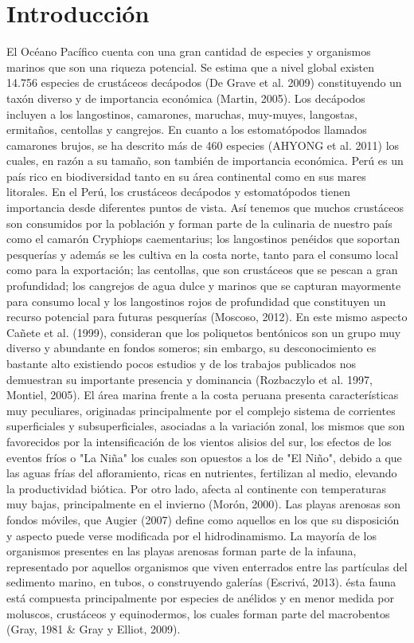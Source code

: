 \documentclass[5p,times,authoryear]{elsarticle}
\begin{document}
\section{Introducción}
El Oc\'eano Pac\'ifico cuenta con una gran cantidad de especies y organismos marinos que son una riqueza potencial. Se estima que a nivel global existen 14.756 especies de crust\'aceos dec\'apodos (De Grave et al. 2009) constituyendo un tax\'on diverso y de importancia econ\'omica (Martin, 2005). Los dec\'apodos incluyen a los langostinos, camarones, maruchas, muy-muyes, langostas, ermita\~nos, centollas y cangrejos. En cuanto a los estomat\'opodos llamados camarones brujos, se ha descrito m\'as de 460 especies (AHYONG et al. 2011) los cuales, en raz\'on a su tama\~no, son tambi\'en de importancia econ\'omica. 
Per\'u es un pa\'is rico en biodiversidad tanto en su \'area continental como en sus mares litorales.  En el Per\'u, los crust\'aceos dec\'apodos y estomat\'opodos tienen importancia desde diferentes puntos de vista. As\'i tenemos que muchos crust\'aceos son consumidos por la poblaci\'on y forman parte de la culinaria de nuestro pa\'is como el camar\'on Cryphiops caementarius; los langostinos pen\'eidos que soportan pesquer\'ias y adem\'as se les cultiva en la costa norte, tanto para el consumo local como para la exportaci\'on; las centollas, que son crust\'aceos que se pescan a gran profundidad; los cangrejos de agua dulce y marinos que se capturan mayormente para consumo local y los langostinos rojos de profundidad que constituyen un recurso potencial para futuras pesquer\'ias (Moscoso, 2012).
En este mismo aspecto Ca\~nete et al. (1999), consideran que los poliquetos bent\'onicos son un grupo muy diverso y abundante en fondos someros; sin embargo, su desconocimiento es bastante alto existiendo pocos estudios y de los trabajos publicados nos demuestran su importante presencia y dominancia (Rozbaczylo et al. 1997, Montiel, 2005).
El \'area marina frente a la costa peruana presenta caracter\'isticas muy peculiares, originadas principalmente por el complejo sistema de corrientes superficiales y subsuperficiales, asociadas a la variaci\'on zonal, los mismos que son favorecidos por la intensificaci\'on de los vientos alisios del sur, los efectos de los eventos fr\'ios o "La Ni\~na" los cuales son opuestos a los de "El Ni\~no", debido a que las aguas fr\'ias del afloramiento, ricas en nutrientes, fertilizan al medio, elevando la productividad bi\'otica. Por otro lado, afecta al continente con temperaturas muy bajas, principalmente en el invierno (Mor\'on, 2000).
Las playas arenosas son fondos m\'oviles, que Augier (2007) define como aquellos en los que su disposici\'on y aspecto puede verse modificada por el hidrodinamismo. La mayor\'ia de los organismos presentes en las playas arenosas forman parte de la infauna, representado por aquellos organismos que viven enterrados entre las part\'iculas del sedimento marino, en tubos, o construyendo galer\'ias (Escriv\'a, 2013). \'esta fauna est\'a compuesta principalmente por especies de an\'elidos y en menor medida por moluscos, crust\'aceos y equinodermos, los cuales forman parte del macrobentos (Gray, 1981 \& Gray y Elliot, 2009).
\end{document}
